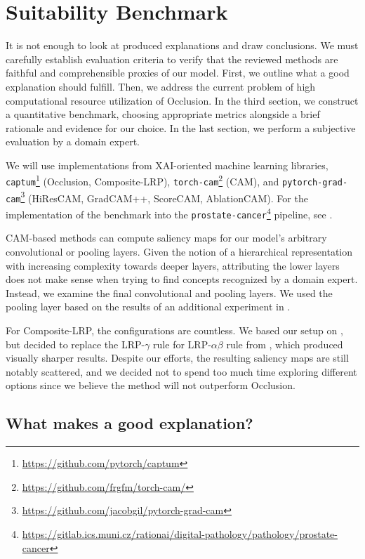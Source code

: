 \chapter{Suitability Benchmark}\label{experiment}

It is not enough to look at produced explanations and draw conclusions.
We must carefully establish evaluation criteria to verify that the reviewed methods are faithful and comprehensible proxies of our model.
First, we outline what a good explanation should fulfill.
Then, we address the current problem of high computational resource utilization of Occlusion.
In the third section, we construct a quantitative benchmark, choosing appropriate metrics alongside a brief rationale and evidence for our choice.
In the last section, we perform a subjective evaluation by a domain expert.

We will use implementations from XAI-oriented machine learning libraries, \texttt{captum}\footnote{\url{https://github.com/pytorch/captum}} (Occlusion, Composite-LRP), \texttt{torch-cam}\footnote{\url{https://github.com/frgfm/torch-cam/}} (CAM), and \texttt{pytorch-grad-cam}\footnote{\url{https://github.com/jacobgil/pytorch-grad-cam}} (HiResCAM, GradCAM++, ScoreCAM, AblationCAM).
For the implementation of the benchmark into the \texttt{prostate-cancer}\footnote{\url{https://gitlab.ics.muni.cz/rationai/digital-pathology/pathology/prostate-cancer}} pipeline, see .

CAM-based methods can compute saliency maps for our model's arbitrary convolutional or pooling layers.
Given the notion of a hierarchical representation with increasing complexity towards deeper layers, attributing the lower layers does not make sense when trying to find concepts recognized by a domain expert.
Instead, we examine the final convolutional and pooling layers.
We used the pooling layer based on the results of an additional experiment in .

For Composite-LRP, the configurations are countless. We based our setup on , but decided to replace the LRP-$\gamma$ rule for LRP-$\alpha\beta$ rule from \cite{lrp-alpha-beta}, which produced visually sharper results.
Despite our efforts, the resulting saliency maps are still notably scattered, and we decided not to spend too much time exploring different options since we believe the method will not outperform Occlusion.

\pagebreak

\section{What makes a good explanation?}

